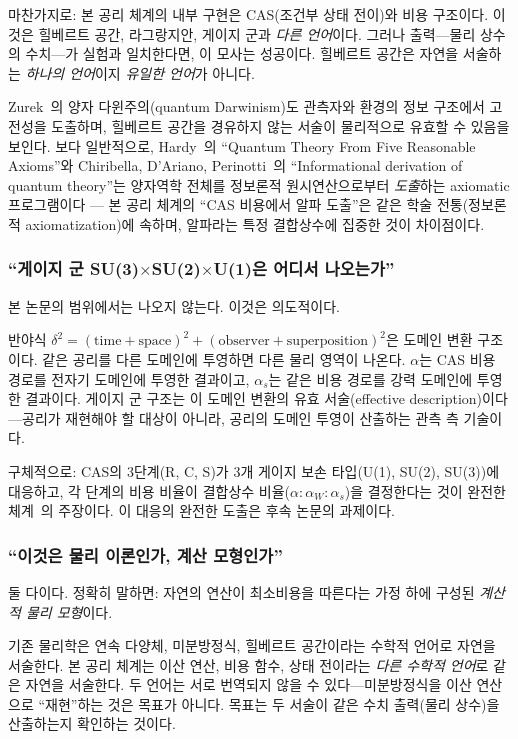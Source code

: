 \documentclass[entropy,article,submit,pdftex,oneauthor]{Definitions/mdpi}
\begin{document}
마찬가지로: 본 공리 체계의 내부 구현은 CAS(조건부 상태 전이)와 비용 구조이다. 이것은 힐베르트 공간, 라그랑지안, 게이지 군과 \emph{다른 언어}이다. 그러나 출력---물리 상수의 수치---가 실험과 일치한다면, 이 모사는 성공이다. 힐베르트 공간은 자연을 서술하는 \emph{하나의 언어}이지 \emph{유일한 언어}가 아니다.

Zurek~\cite{zurek2009}의 양자 다윈주의(quantum Darwinism)도 관측자와 환경의 정보 구조에서 고전성을 도출하며, 힐베르트 공간을 경유하지 않는 서술이 물리적으로 유효할 수 있음을 보인다. 보다 일반적으로, Hardy~\cite{hardy2001}의 ``Quantum Theory From Five Reasonable Axioms''와 Chiribella, D'Ariano, Perinotti~\cite{cdp2011}의 ``Informational derivation of quantum theory''는 양자역학 전체를 정보론적 원시연산으로부터 \emph{도출}하는 axiomatic 프로그램이다 --- 본 공리 체계의 ``CAS 비용에서 알파 도출''은 같은 학술 전통(정보론적 axiomatization)에 속하며, 알파라는 특정 결합상수에 집중한 것이 차이점이다.

\subsubsection{``게이지 군 SU(3)$\times$SU(2)$\times$U(1)은 어디서 나오는가''}

본 논문의 범위에서는 나오지 않는다. 이것은 의도적이다.

반야식 $\delta^2 = (\mathrm{time}+\mathrm{space})^2 + (\mathrm{observer}+\mathrm{superposition})^2$은 도메인 변환 구조이다. 같은 공리를 다른 도메인에 투영하면 다른 물리 영역이 나온다. $\alpha$는 CAS 비용 경로를 전자기 도메인에 투영한 결과이고, $\alpha_s$는 같은 비용 경로를 강력 도메인에 투영한 결과이다. 게이지 군 구조는 이 도메인 변환의 유효 서술(effective description)이다---공리가 재현해야 할 대상이 아니라, 공리의 도메인 투영이 산출하는 관측 측 기술이다.

구체적으로: CAS의 3단계(R, C, S)가 3개 게이지 보손 타입(U(1), SU(2), SU(3))에 대응하고, 각 단계의 비용 비율이 결합상수 비율($\alpha : \alpha_W : \alpha_s$)을 결정한다는 것이 완전한 체계~\cite{han2026}의 주장이다. 이 대응의 완전한 도출은 후속 논문의 과제이다.

\subsubsection{``이것은 물리 이론인가, 계산 모형인가''}

둘 다이다. 정확히 말하면: 자연의 연산이 최소비용을 따른다는 가정 하에 구성된 \emph{계산적 물리 모형}이다.

기존 물리학은 연속 다양체, 미분방정식, 힐베르트 공간이라는 수학적 언어로 자연을 서술한다. 본 공리 체계는 이산 연산, 비용 함수, 상태 전이라는 \emph{다른 수학적 언어}로 같은 자연을 서술한다. 두 언어는 서로 번역되지 않을 수 있다---미분방정식을 이산 연산으로 ``재현''하는 것은 목표가 아니다. 목표는 두 서술이 같은 수치 출력(물리 상수)을 산출하는지 확인하는 것이다.
\end{document}
